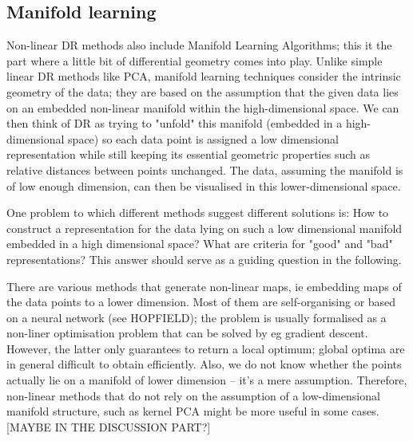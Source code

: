 \documentclass[journal, a4paper]{IEEEtran}
\begin{document}
\subsection{Manifold learning}

Non-linear DR methods also include Manifold Learning Algorithms; this it the part where a little bit of differential geometry comes into play.
Unlike simple linear DR methods like PCA, manifold learning techniques consider the intrinsic geometry of the data; they are based on the assumption that the given data lies on an embedded non-linear manifold within the high-dimensional space. We can then think of DR as trying to "unfold" this manifold (embedded in a high-dimensional space) so each data point is assigned a low dimensional representation while still keeping its essential geometric properties such as relative distances between points unchanged.
The data, assuming the manifold is of low enough dimension, can then be visualised in this lower-dimensional space.

One problem to which different methods suggest different solutions is: How to construct a representation for the data lying on such a low dimensional manifold embedded in a high dimensional space? What are criteria for "good" and "bad" representations? This answer should serve as a guiding question in the following.


There are various methods that generate non-linear maps, ie embedding maps of the data points to a lower dimension. Most of them are self-organising or based on a neural network (see HOPFIELD); the problem is usually formalised as a non-liner optimisation problem that can be solved by eg gradient descent. However, the latter only guarantees to return a local optimum; global optima are in general difficult to obtain efficiently. Also, we do not know whether the points actually lie on a manifold of lower dimension -- it's a mere assumption.
Therefore, non-linear methods that do not rely on the assumption of a low-dimensional manifold structure, such as kernel PCA might be more useful in some cases. [MAYBE IN THE DISCUSSION PART?]
\end{document}
